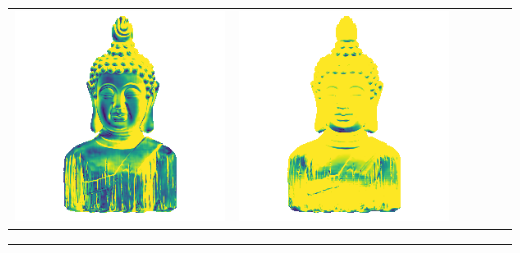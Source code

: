 \begin{tabularx}{\linewidth}{@{}Y@{}Y@{}Y@{}Y@{}Y@{}Y@{}}
\includegraphics[width=\linewidth]{semisynthetic/20150514_16_marrnet_err.png} &
\includegraphics[width=\linewidth]{semisynthetic/20150514_16_ef_err.png} \\
\end{tabularx}
\begin{center}\rule{0.5\linewidth}{\linethickness}\end{center}

